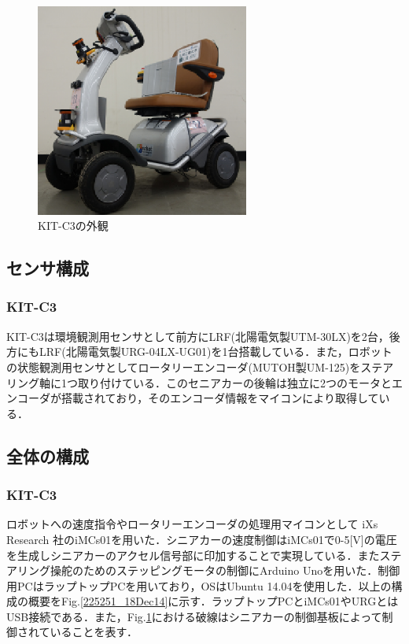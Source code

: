 \documentclass[10pt,a4paper]{jarticle}
\begin{document}
\begin{figure}
  \centering
  \includegraphics[width=7cm]{fig/eps/kitc3.eps}
  \caption{KIT-C3の外観}
  \label{213021_18Dec14}
\end{figure}

\subsection{センサ構成}

\subsubsection{KIT-C3}
KIT-C3は環境観測用センサとして前方にLRF(北陽電気製UTM-30LX)を2台，後方にもLRF(北陽電気製URG-04LX-UG01)を1台搭載している．また，ロボットの状態観測用センサとしてロータリーエンコーダ(MUTOH製UM-125)をステアリング軸に1つ取り付けている．このセニアカーの後輪は独立に2つのモータとエンコーダが搭載されており，そのエンコーダ情報をマイコンにより取得している．

\subsection{全体の構成}
\subsubsection{KIT-C3}
ロボットへの速度指令やロータリーエンコーダの処理用マイコンとして iXs Research 社のiMCs01を用いた．シニアカーの速度制御はiMCs01で0-5[V]の電圧を生成しシニアカーのアクセル信号部に印加することで実現している．またステアリング操舵のためのステッピングモータの制御にArduino Unoを用いた．制御用PCはラップトップPCを用いており，OSはUbuntu 14.04を使用した．以上の構成の概要をFig.\ref{225251_18Dec14}に示す．ラップトップPCとiMCs01やURGとはUSB接続である．また，Fig.\ref{213021_18Dec14}における破線はシニアカーの制御基板によって制御されていることを表す．
\end{document}
